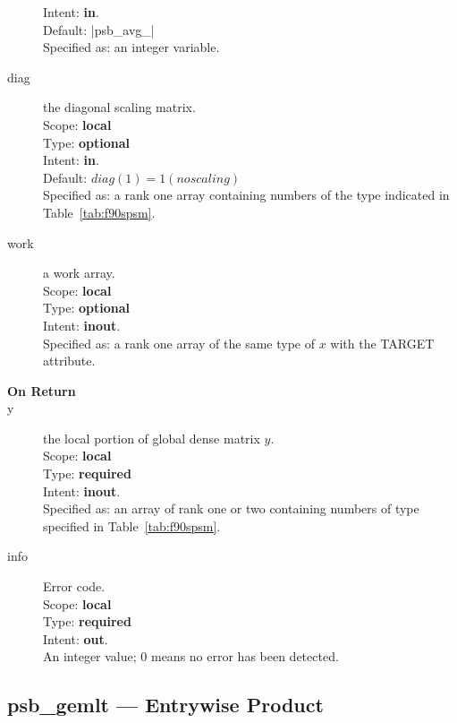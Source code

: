 \begin{description}
Intent: {\bf in}.\\
Default: \fortinline|psb_avg_|\\
Specified as: an integer variable.
\item[diag] the diagonal scaling matrix.\\
Scope: {\bf local} \\
Type: {\bf optional}\\
Intent: {\bf in}.\\
Default: $diag(1) = 1 (no scaling)$\\
Specified as: a rank one  array containing numbers of the type
indicated in Table~\ref{tab:f90spsm}.
\item[work] a work array. \\
Scope: {\bf local} \\
Type: {\bf optional}\\
Intent: {\bf inout}.\\
Specified as: a rank one array of the same type of $x$ with the
TARGET attribute.

\item[\bf On Return]
\item[y] the local portion of global dense matrix
$y$. %
\\
Scope: {\bf local} \\
Type: {\bf required} \\
Intent: {\bf inout}.\\
Specified as: an array of rank one or two
containing numbers of type specified in
Table~\ref{tab:f90spsm}.
\item[info] Error code.\\
Scope: {\bf local} \\
Type: {\bf required} \\
Intent: {\bf out}.\\
An integer value; 0 means no error has been detected.
\end{description}

%
%


\clearpage\subsection{psb\_gemlt --- Entrywise Product}

